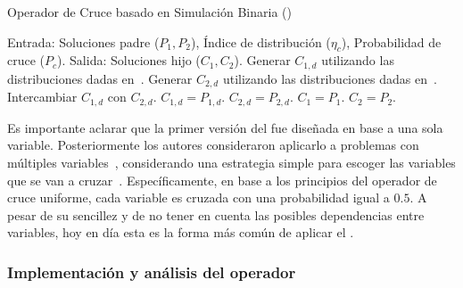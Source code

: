 \begin{algorithm}[t]
\scriptsize
\caption{Operador de Cruce basado en Simulación Binaria (\SBX{})}
\label{alg:SBX_Operator}
\begin{algorithmic}[1]
    \STATE Entrada: Soluciones padre ($P_{1}, P_{2}$), Índice de distribución ($\eta_c$), Probabilidad de cruce ($P_c$).
    \STATE Salida: Soluciones hijo ($C_{1}, C_{2}$).
	 \label{alg:inherit_variable}
		\STATE Generar $C_{1,d}$ utilizando las distribuciones dadas en~\cite{deb1999self}. 
		\STATE Generar $C_{2,d}$ utilizando las distribuciones dadas en~\cite{deb1999self}.
			\STATE Intercambiar $C_{1,d}$ con $C_{2,d}$.
		 \ENDIF
        \ELSE
	   \STATE $C_{1,d} = P_{1, d}$.
	   \STATE $C_{2,d} = P_{2, d}$.
        \ENDIF
       \ENDFOR
    \ELSE
	\STATE $C_{1} = P_{1}$.
	\STATE $C_{2} = P_{2}$.
    \ENDIF
\end{algorithmic}
\end{algorithm}

Es importante aclarar que la primer versión del \SBX{} fue diseñada en base a una sola variable.
%
Posteriormente los autores consideraron aplicarlo a problemas con múltiples variables~\cite{Joel:SBX1994}, considerando
una estrategia simple para escoger las variables que se van a cruzar~\cite{Joel:UNDX}.
%
Específicamente, en base a los principios del operador de cruce uniforme, cada variable es cruzada con una probabilidad igual a $0.5$.
%
A pesar de su sencillez y de no tener en cuenta las posibles dependencias entre variables, hoy en día esta es la forma más común de 
aplicar el \SBX{}.

\subsubsection{Implementación y análisis del operador \SBX{}}

